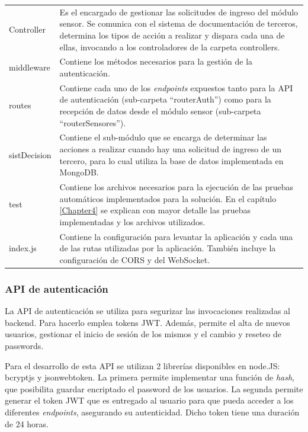\begin{table}[h]
\begin{tabular}{p{2cm} p{11cm}}
Controller & Es el encargado de gestionar las solicitudes de ingreso del módulo sensor. Se comunica con el sistema de documentación de terceros, determina los tipos de acción a realizar y dispara cada una de ellas, invocando a los controladores de la carpeta controllers.  \\
middleware & Contiene los métodos necesarios para la gestión de la autenticación. \\
routes & Contiene cada uno de los \textit{endpoints} expuestos tanto para la API de autenticación (sub-carpeta ``routerAuth'') como para la recepción de datos desde el módulo sensor (sub-carpeta ``routerSensores''). \\
sistDecision & Contiene el sub-módulo que se encarga de determinar las acciones a realizar cuando hay una solicitud de ingreso de un tercero, para lo cual utiliza la base de datos implementada en MongoDB. \\
test & Contiene los archivos necesarios para la ejecución de las pruebas automáticos implementados para la solución. En el capítulo \ref{Chapter4} se explican con mayor detalle las pruebas implementadas y los archivos utilizados. \\
index.js & Contiene la configuración para levantar la aplicación y cada una de las rutas utilizadas por la aplicación. También incluye la configuración de CORS y del WebSocket. \\
		\bottomrule
		\hline
	\end{tabular}
	\label{tab:carpetasBackend}
\end{table}

\clearpage
\subsubsection{API de autenticación}

La API de autenticación se utiliza para segurizar las invocaciones realizadas al backend. Para hacerlo emplea tokens JWT. Además, permite el alta de nuevos usuarios, gestionar el inicio de sesión de los mismos y el cambio y reseteo de passwords.

Para el desarrollo de esta API se utilizan 2 librerías disponibles en node.JS: bcryptjs y jsonwebtoken. La primera permite implementar una función de \textit{hash}, que posibilita guardar encriptado el password de los usuarios. La segunda permite generar el token JWT que es entregado al usuario para que pueda acceder a los diferentes \textit{endpoints}, asegurando su autenticidad. Dicho token tiene una duración de 24 horas.

